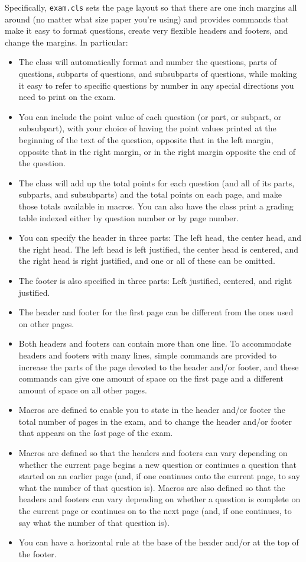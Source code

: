 \documentclass[12pt]{exam}
\begin{document}
Specifically, \verb"exam.cls" sets the page layout so that there are
one inch margins all around (no matter what size paper you're using)
and provides commands that make it easy to format questions, create
very flexible headers and footers, and change the margins.  In
particular:
\begin{itemize}
\item The class will automatically format and number the questions,
  parts of questions, subparts of questions, and subsubparts of
  questions, while making it easy to refer to specific questions by
  number in any special directions you need to print on the exam.
\item You can include the point value of each question (or part, or
  subpart, or subsubpart), with your choice of having the point values
  printed at the beginning of the text of the question, opposite that
  in the left margin, opposite that in the right margin, or in the
  right margin opposite the end of the question.
\item The class will add up the total points for each question (and
  all of its parts, subparts, and subsubparts) and the total points on
  each page, and make those totals available in macros.  You can also
  have the class print a grading table indexed either by question
  number or by page number.
\item You can specify the header in three parts: The left head, the
  center head, and the right head.  The left head is left justified,
  the center head is centered, and the right head is right justified,
  and one or all of these can be omitted.
\item The footer is also specified in three parts: Left justified,
  centered, and right justified.
\item The header and footer for the first page can be different from
  the ones used on other pages.
\item Both headers and footers can contain more than one line.  To
  accommodate headers and footers with many lines, simple commands are
  provided to increase the parts of the page devoted to the header
  and/or footer, and these commands can give one amount of space on
  the first page and a different amount of space on all other pages.
\item Macros are defined to enable you to state in the header and/or
  footer the total number of pages in the exam, and to change the
  header and/or footer that appears on the \emph{last} page of the
  exam.
\item Macros are defined so that the headers and footers can vary
  depending on whether the current page begins a new question or
  continues a question that started on an earlier page (and, if one
  continues onto the current page, to say what the number of that
  question is).  Macros are also defined so that the headers and
  footers can vary depending on whether a question is complete on the
  current page or continues on to the next page (and, if one
  continues, to say what the number of that question is).
\item You can have a horizontal rule at the base of the header and/or
  at the top of the footer.
\end{itemize}
\end{document}
